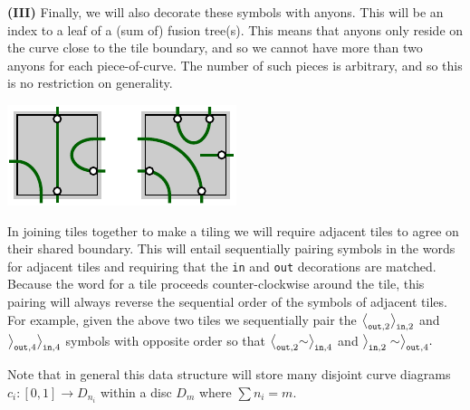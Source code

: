 \vskip 10pt
{\bf (III)} Finally, we will also decorate these symbols with anyons.
This will be an index to a leaf of a (sum of) fusion tree(s).
This means that anyons only reside on the curve close
to the tile boundary,
and so we cannot have more than two anyons
for each piece-of-curve. 
The number of such pieces is arbitrary, and so this
is no restriction on generality.

\begin{center}
\includegraphics[]{pic-cells-2.pdf}
\end{center}

In joining tiles together to make a tiling we will
require adjacent tiles to agree on their shared boundary.
This will entail sequentially pairing symbols in the
words for adjacent tiles
and requiring that 
the {\tt in} and {\tt out} decorations are matched.
Because the word for a tile proceeds counter-clockwise
around the tile, this pairing will always reverse the
sequential order of the symbols of adjacent tiles.
For example, given the above two tiles we sequentially pair the 
$\bigl<_{\mathrm{\tt out},2}\bigr>_{\mathrm{\tt in},2}$ 
and $\bigr>_{\mathrm{\tt out},4}\bigr>_{\mathrm{\tt in},4}$
symbols with opposite order so that
$\bigl<_{\mathrm{\tt out},2}\sim\bigr>_{\mathrm{\tt in},4}$
and $\bigr>_{\mathrm{\tt in},2} \sim \bigr>_{\mathrm{\tt out},4}.$ 

\vskip 5pt


Note that in general this data structure will store many disjoint curve diagrams
$c_i:[0,1]\to D_{n_i}$ within a disc $D_m$ where $\sum n_i = m.$


